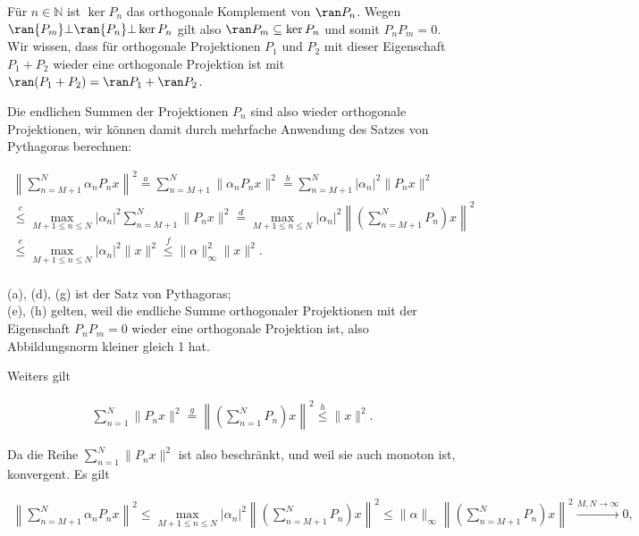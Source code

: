 \begin{exercise}
\end{exercise}
\begin{solution}
\newpage
Für $n \in \mathbb{N}$ ist $\ker{P_n}$ das orthogonale Komplement von $\ran P_n$.
Wegen $\ran{P_m} \bot \ran{P_n} \bot \ker{P_n}$ gilt also $\ran P_m \subseteq \ker P_n$ und somit $P_n P_m = 0$.
 Wir wissen, dass für orthogonale Projektionen $P_1$ und $P_2$ mit dieser Eigenschaft $P_1 + P_2$ wieder eine orthogonale Projektion ist mit $\ran(P_1 + P_2) = \ran P_1 + \ran P_2$.

Die endlichen Summen der Projektionen $P_n$ sind also wieder orthogonale Projektionen, wir können damit durch mehrfache Anwendung des Satzes von Pythagoras berechnen:

\begin{align}
    \left\| \sum_{n = M+1}^N \alpha_n P_n x \right\|^2 \stackrel{a}{=} \sum_{n = M+1}^N \| \alpha_n P_n x \|^2 \stackrel{b}{=} \sum_{n = M+1}^N | \alpha_n|^2 \| P_n x \|^2 \\
    \stackrel{c}{\leq} \max_{M+1 \leq n \leq N} |\alpha_n|^2 \sum_{n = M+1}^N \| P_n x \|^2 \stackrel{d}{=}
    \max_{M+1 \leq n \leq N} |\alpha_n|^2 \left\| \left(\sum_{n = M+1}^N P_n\right) x \right\|^2 \\ \stackrel{e}{\leq}
    \max_{M+1 \leq n \leq N} |\alpha_n|^2 \|x\|^2
    \stackrel{f}{\leq} \| \alpha \|_{\infty}^2 \| x \|^2.
\end{align}
\\
(a), (d), (g) ist der Satz von Pythagoras; \\
(e), (h) gelten, weil die endliche Summe orthogonaler Projektionen mit der Eigenschaft $P_n P_m = 0$ wieder eine orthogonale Projektion ist, also Abbildungsnorm kleiner gleich 1 hat.

Weiters gilt

\begin{align}
    \sum_{n = 1}^N \| P_n x \|^2 \stackrel{g}{=}
     \left\| \left(\sum_{n = 1}^N P_n\right) x \right\|^2 \stackrel{h}{\leq} \|x\|^2.
\end{align}

Da die Reihe $\sum_{n = 1}^N \| P_n x \|^2$ ist also beschränkt, und weil sie auch monoton ist, konvergent. Es gilt

\begin{align}
\left\| \sum_{n = M+1}^N \alpha_n P_n x \right\|^2 \leq \max_{M+1 \leq n \leq N} |\alpha_n|^2 \left\| \left(\sum_{n = M+1}^N P_n\right) x \right\|^2
\leq \|\alpha\|_{\infty} \left\| \left(\sum_{n = M+1}^N P_n\right) x \right\|^2 \stackrel{M, N \rightarrow \infty}{\longrightarrow} 0,
\end{align}


\end{solution}
